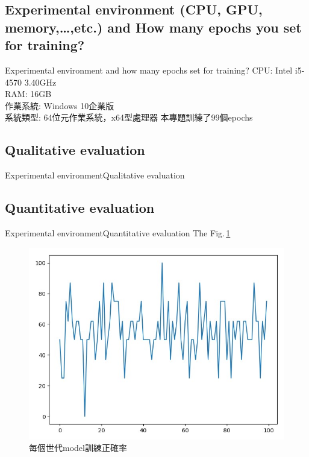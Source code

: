 \documentclass{beamer}
\begin{document}
\begin{CJK}{UTF8}{nkai}
\subsection{Experimental environment (CPU, GPU, memory,…,etc.) and How many epochs you set for training? }
\begin{frame}{Experimental environment and how many epochs set for training?}
	CPU: Intel i5-4570 3.40GHz\\
	RAM: 16GB\\
	作業系統: Windows 10企業版\\
	系統類型: 64位元作業系統，x64型處理器\newline\newline
	本專題訓練了99個epochs
\end{frame}

\subsection{Qualitative evaluation}
\begin{frame}{Experimental environment}{Qualitative evaluation}
	
\end{frame}
\subsection{Quantitative evaluation}





\end{CJK}
\end{document}
